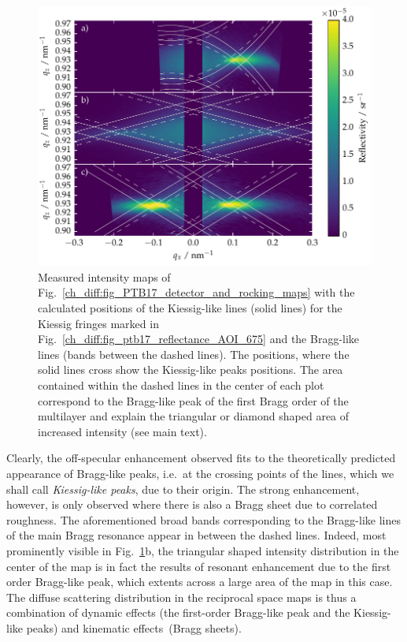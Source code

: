 \begin{figure}[htbp]
        \includegraphics[width=\textwidth]{img/kiessig_like_peaks_diffuse_map} \caption{Measured intensity maps of Fig.~\ref{ch_diff:fig_PTB17_detector_and_rocking_maps} with the calculated positions of the Kiessig-like lines (solid lines) for the Kiessig fringes marked in Fig.~\ref{ch_diff:fig_ptb17_reflectance_AOI_675} and the Bragg-like lines (bands between the dashed lines). The positions, where the solid lines cross show the Kiessig-like peaks positions. The area contained within the dashed lines in the center of each plot correspond to the Bragg-like peak of the first Bragg order of the multilayer and explain the triangular or diamond shaped area of increased intensity (see main text).} \label{ch_diff:fig_kiessig_like_peaks_diffuse_map} 
\end{figure}
Clearly, the off-specular enhancement observed fits to the theoretically predicted appearance of Bragg-like peaks, i.e.~at the crossing points of the lines, which we shall call \emph{Kiessig-like peaks}, due to their origin. The strong enhancement, however, is only observed where there is also a Bragg sheet due to correlated roughness. The aforementioned broad bands corresponding to the Bragg-like lines of the main Bragg resonance appear in between the dashed lines. Indeed, most prominently visible in Fig.~\ref{ch_diff:fig_kiessig_like_peaks_diffuse_map}b, the triangular shaped intensity distribution in the center of the map is in fact the results of resonant enhancement due to the first order Bragg-like peak, which extents across a large area of the map in this case.
The diffuse scattering distribution in the reciprocal space maps is thus a combination of dynamic effects (the first-order Bragg-like peak and the Kiessig-like peaks) and kinematic effects~(Bragg sheets).

